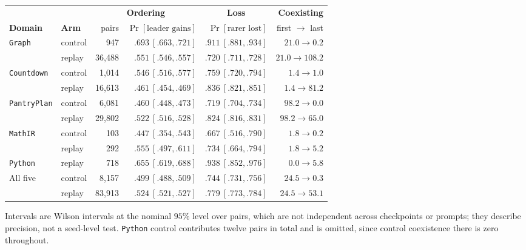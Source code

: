 \begin{center}
\small
\begin{tabular}{@{}llrrrr@{}}
\toprule
& & \multicolumn{2}{c}{\textbf{Ordering}} & \multicolumn{1}{c}{\textbf{Loss}} & \textbf{Coexisting} \\
\cmidrule(lr){3-4}\cmidrule(lr){5-5}\cmidrule(lr){6-6}
\textbf{Domain} & \textbf{Arm} & pairs & $\Pr[\text{leader gains}]$ & $\Pr[\text{rarer lost}]$ & first $\to$ last \\
\midrule
\texttt{Graph} & control & 947 & $.693\ [.663,.721]$ & $.911\ [.881,.934]$ & $21.0\to0.2$ \\
               & replay  & 36{,}488 & $.551\ [.546,.557]$ & $.720\ [.711,.728]$ & $21.0\to108.2$ \\
\addlinespace
\texttt{Countdown} & control & 1{,}014 & $.546\ [.516,.577]$ & $.759\ [.720,.794]$ & $1.4\to1.0$ \\
                   & replay  & 16{,}613 & $.461\ [.454,.469]$ & $.836\ [.821,.851]$ & $1.4\to81.2$ \\
\addlinespace
\texttt{PantryPlan} & control & 6{,}081 & $.460\ [.448,.473]$ & $.719\ [.704,.734]$ & $98.2\to0.0$ \\
                    & replay  & 29{,}802 & $.522\ [.516,.528]$ & $.824\ [.816,.831]$ & $98.2\to65.0$ \\
\addlinespace
\texttt{MathIR} & control & 103 & $.447\ [.354,.543]$ & $.667\ [.516,.790]$ & $1.8\to0.2$ \\
                & replay  & 292 & $.555\ [.497,.611]$ & $.734\ [.664,.794]$ & $1.8\to5.2$ \\
\addlinespace
\texttt{Python} & replay & 718 & $.655\ [.619,.688]$ & $.938\ [.852,.976]$ & $0.0\to5.8$ \\
\midrule
All five & control & 8{,}157 & $.499\ [.488,.509]$ & $.744\ [.731,.756]$ & $24.5\to0.3$ \\
         & replay  & 83{,}913 & $.524\ [.521,.527]$ & $.779\ [.773,.784]$ & $24.5\to53.1$ \\
\bottomrule
\end{tabular}
\end{center}

Intervals are Wilson intervals at the nominal $95\%$ level over pairs, which
are not independent across checkpoints or prompts; they describe precision, not
a seed-level test. \texttt{Python} control contributes twelve pairs in total and
is omitted, since control coexistence there is zero throughout.

